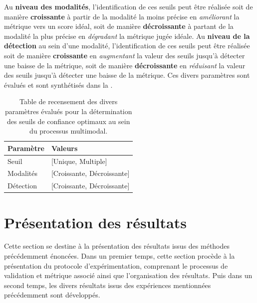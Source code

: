 Au \textbf{niveau des modalités}, l'identification de ces seuils peut être réalisée soit de manière \textbf{croissante} à partir de la modalité la moins précise en \textit{améliorant} la métrique vers un score idéal, soit de manière \textbf{décroissante} à partant de la modalité la plus précise en \textit{dégradant} la métrique jugée idéale. Au \textbf{niveau de la détection} au sein d'une modalité, l'identification de ces seuils peut être réalisée soit de manière \textbf{croissante} en \textit{augmentant} la valeur des seuils jusqu'à détecter une baisse de la métrique, soit de manière \textbf{décroissante} en \textit{réduisant} la valeur des seuils jusqu'à détecter une baisse de la métrique. Ces divers paramètres sont évalués et sont synthétisés dans la .\par

\begin{table}[H]
    \centering
    \begin{tabular}{ll}
        \toprule 
        Paramètre                   & Valeurs                   \\ \midrule
        Seuil                       & [Unique, Multiple]        \\ \midrule
        Modalités                   & [Croissante, Décroissante]\\ \midrule
        Détection                   & [Croissante, Décroissante]\\ \bottomrule
    \end{tabular}
    \caption{Table de recensement des divers paramètres évalués pour la détermination des seuils de confiance optimaux au sein du processus multimodal.}
    \label{tab:multimodal_confidence_model_values}
\end{table}
 
\clearpage

\section{Présentation des résultats}
Cette section se destine à la présentation des résultats issus des méthodes précédemment énoncées. Dans un premier temps, cette section procède à la présentation du protocole d'expérimentation, comprenant le processus de validation et métrique associé ainsi que l'organisation des résultats. Puis dans un second temps, les divers résultats issus des expériences mentionnées précédemment sont développés.\par


